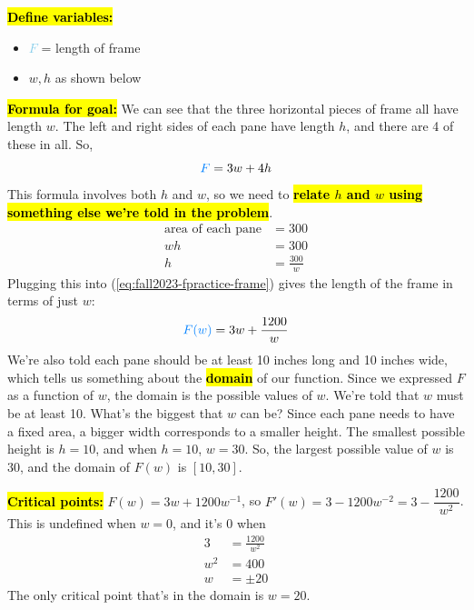 \documentclass{article}
\newcommand{\highlight}[1]{\boldmath\hl{\textbf{#1}}\unboldmath}
\newcommand{\goal}[1]{\textbf{\textcolor{skyblue}{#1}}}
\theoremstyle{theorem}
\begin{document}
\begin{enumerate}
\begin{solution}
    \highlight{Define variables:}
    \begin{itemize}[nosep]
    \item \goal{$F$} = length of frame
    \item $w, h$ as shown below
    \end{itemize}
    \begin{center}
    \end{center}
    \highlight{Formula for goal:} We can see that the three horizontal pieces of frame all have length $w$. The left and right sides of each pane have length $h$, and there are 4 of these in all. So,
    \begin{equation}
      \label{eq:fall2023-fpractice-frame}
      \goal{$F$} = 3w + 4h 
    \end{equation}
    This formula involves both $h$ and $w$, so we need to \highlight{relate $h$ and $w$ using something else we're told in the problem}. 
    \begin{align*}
      \text{area of each pane} &= 300 \\
      wh &= 300 \\
      h &= \frac{300}{w}
    \end{align*}
    Plugging this into (\ref{eq:fall2023-fpractice-frame}) gives the length of the frame in terms of just $w$:
    \[ \goal{$F(w)$} = 3w + \dfrac{1200}{w}\]
    We're also told each pane should be at least 10 inches long and 10 inches wide, which tells us something about the \highlight{domain} of our function. Since we expressed $F$ as a function of $w$, the domain is the possible values of $w$. We're told that $w$ must be at least 10. What's the biggest that $w$ can be? Since each pane needs to have a fixed area, a bigger width corresponds to a smaller height. The smallest possible height is $h = 10$, and when $h = 10$, $w = 30$. So, the largest possible value of $w$ is 30, and the domain of $F(w)$ is $[10, 30]$. 

    \highlight{Critical points:} $\displaystyle F(w) = 3w + 1200 w^{-1}$, so $F'(w) = 3 - 1200 w^{-2} = 3 - \dfrac{1200}{w^2}$. This is undefined when $w = 0$, and it's 0 when
    \begin{align*}
      3 &= \frac{1200}{w^2} \\
      w^2 &= 400 \\
      w &= \pm 20
    \end{align*}
    The only critical point that's in the domain is $w = 20$.


\end{solution}
\end{enumerate}
\end{document}

